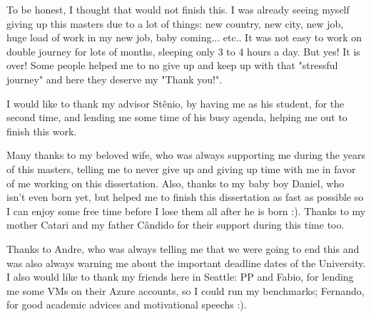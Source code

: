 To be honest, I thought that would not finish this. I was already seeing myself giving up this masters due to a lot of
things: new country, new city, new job, huge load of work in my new job, baby coming... etc.. It was not easy to work on
double journey for lots of months, sleeping only 3 to 4 hours a day. But yes! It is over! Some people helped me to no
give up and keep up with that "stressful journey" and here they deserve my "Thank you!".

I would like to thank my advisor Stênio, by having me as his student, for the second time, and lending me some time of
his busy agenda, helping me out to finish this work.

Many thanks to my beloved wife, who was always supporting me during the years of this masters, telling me to never give
up and giving up time with me in favor of me working on this dissertation. Also, thanks to my baby boy Daniel, who isn't
even born yet, but helped me to finish this dissertation as fast as possible so I can enjoy some free time before I lose
them all after he is born :). Thanks to my mother Catari and my father Cândido for their support during this time too.

Thanks to Andre, who was always telling me that we were going to end this and was also always warning me about the
important deadline dates of the University. I also would like to thank my friends here in Seattle: PP and Fabio, for
lending me some VMs on their Azure accounts, so I could run my benchmarks; Fernando, for good academic advices and
motivational speechs :).

